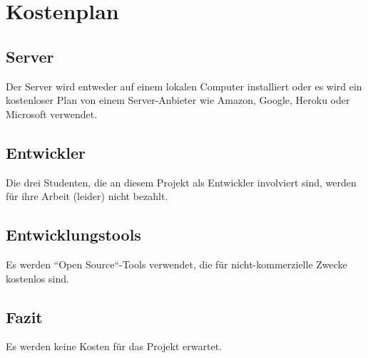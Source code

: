 \section{Kostenplan}
\subsection{Server}
Der Server wird entweder auf einem lokalen Computer installiert oder es wird ein kostenloser Plan von einem Server-Anbieter wie Amazon, Google, Heroku oder Microsoft verwendet.

\subsection{Entwickler}
Die drei Studenten, die an diesem Projekt als Entwickler involviert sind, werden für ihre Arbeit (leider) nicht bezahlt.

\subsection{Entwicklungstools}
Es werden ``Open Source``-Tools verwendet, die für nicht-kommerzielle Zwecke kostenlos sind.

\subsection{Fazit}
Es werden keine Kosten für das Projekt erwartet.